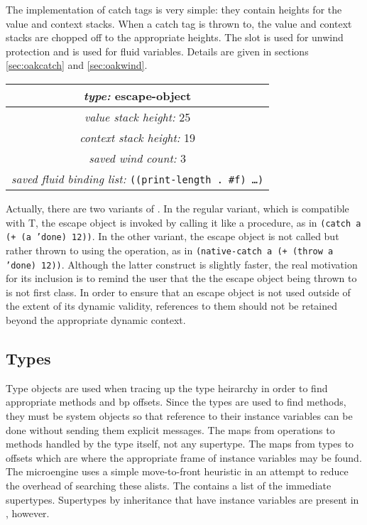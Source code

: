 The implementation of catch tags is very simple: they contain heights
for the value and context stacks.  When a catch tag is thrown to, the
value and context stacks are chopped off to the appropriate heights.
The slot  is used for unwind protection and
 is used for fluid variables.  Details
are given in sections \ref{sec:oakcatch} and \ref{sec:oakwind}.

\begin{center}
\begin{tabular}{|c|}\hline
{\em type:} escape-object \\\hline
{\em value stack height:} 25 \\\hline
{\em context stack height:} 19 \\\hline
{\em saved wind count:} 3 \\\hline
{\em saved fluid binding list:} \tt ((print-length . \#f) \ldots)\\\hline
\end{tabular}
\end{center}

Actually, there are two variants of .  In the regular
variant, which is compatible with T, the escape object is invoked by
calling it like a procedure, as in {\tt (catch a (+ (a 'done) 12))}.
In the other variant, the escape object is not called but rather
thrown to using the  operation, as in {\tt (native-catch a
(+ (throw a 'done) 12))}.  Although the latter construct is slightly
faster, the real motivation for its inclusion is to remind the user
that the the escape object being thrown to is not first class.  In
order to ensure that an escape object is not used outside of the
extent of its dynamic validity, references to them should not be
retained beyond the appropriate dynamic context.

\subsection{Types}

Type objects are used when tracing up the type heirarchy in order to
find appropriate methods and bp offsets.  Since the types are used to
find methods, they must be system objects so that reference to their
instance variables can be done without sending them explicit messages.
The  maps from operations to methods
handled by the type itself, not any supertype.  The 
maps from types to offsets which are where the appropriate frame of
instance variables may be found.  The microengine uses a simple
move-to-front heuristic in an attempt to reduce the overhead of
searching these alists.  The  contains a list of
the immediate supertypes.  Supertypes by inheritance that have
instance variables are present in , however.

